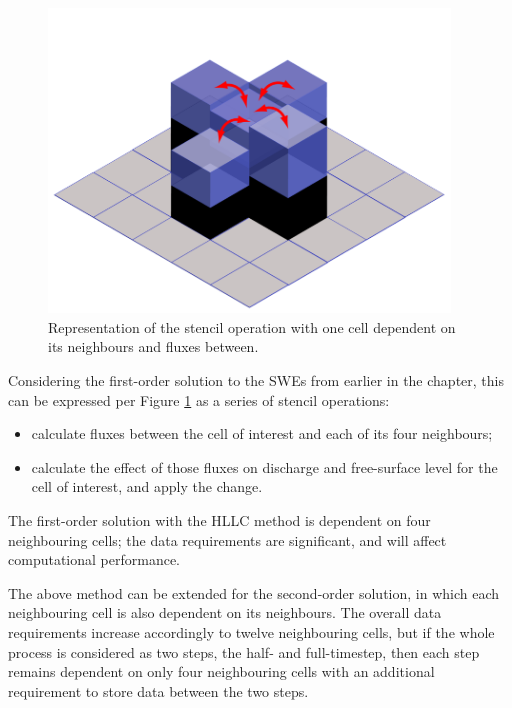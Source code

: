 \begin{figure}[tpb]
	\centering
	\includegraphics[width=0.95\textwidth]{heterogeneous-dev-figures/Stencil_Operation.png}
	\caption{Representation of the stencil operation with one cell dependent on its neighbours and fluxes between.}
	\label{StencilOperation}
\end{figure}

Considering the first-order solution to the SWEs from earlier in the chapter, this can be expressed per Figure \ref{StencilOperation} as a series of stencil operations:
\begin{itemize}
	\item calculate fluxes between the cell of interest and each of its four neighbours;
	\item calculate the effect of those fluxes on discharge and free-surface level for the cell of interest, and apply the change.
\end{itemize}

The first-order solution with the HLLC method is dependent on four neighbouring cells; the data requirements are significant, and will affect computational performance.

The above method can be extended for the second-order solution, in which each neighbouring cell is also dependent on its neighbours. The overall data requirements increase accordingly to twelve neighbouring cells, but if the whole process is considered as two steps, the half- and full-timestep, then each step remains dependent on only four neighbouring cells with an additional requirement to store data between the two steps.

